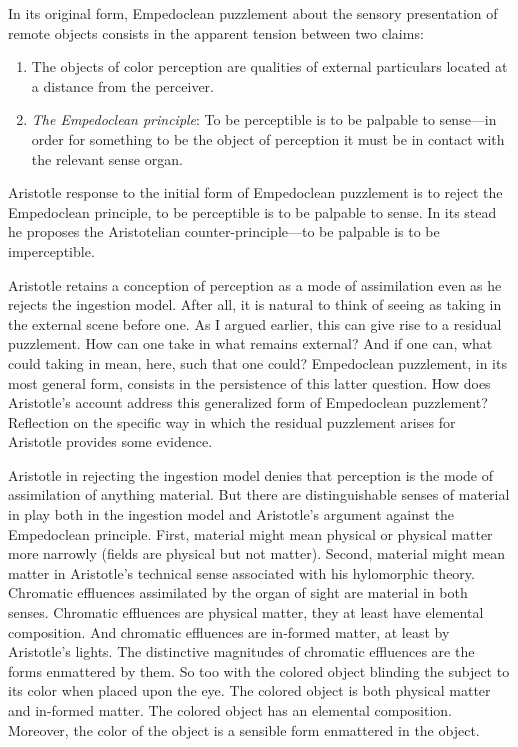 In its original form, Empedoclean puzzlement about the sensory presentation of remote objects consists in the apparent tension between two claims:
\begin{enumerate}[(1)]
    \item The objects of color perception are qualities of external particulars located at a distance from the perceiver.
    \item \emph{The Empedoclean principle}: To be perceptible is to be palpable to sense---in order for something to be the object of perception it must be in contact with the relevant sense organ.
\end{enumerate}
Aristotle response to the initial form of Empedoclean puzzlement is to reject the Empedoclean principle, to be perceptible is to be palpable to sense. In its stead he proposes the Aristotelian counter-principle---to be palpable is to be imperceptible. 

Aristotle retains a conception of perception as a mode of assimilation even as he rejects the ingestion model. After all, it is natural to think of seeing as taking in the external scene before one. As I argued earlier, this can give rise to a residual puzzlement. How can one take in what remains external? And if one can, what could taking in mean, here, such that one could? Empedoclean puzzlement, in its most general form, consists in the persistence of this latter question. How does Aristotle's account address this generalized form of Empedoclean puzzlement? Reflection on the specific way in which the residual puzzlement arises for Aristotle provides some evidence.

Aristotle in rejecting the ingestion model denies that perception is the mode of assimilation of anything material. But there are distinguishable senses of material in play both in the ingestion model and Aristotle's argument against the Empedoclean principle. First, material might mean physical or physical matter more narrowly (fields are physical but not matter). Second, material might mean matter in Aristotle's technical sense associated with his hylomorphic theory. Chromatic effluences assimilated by the organ of sight are material in both senses. Chromatic effluences are physical matter, they at least have elemental composition. And chromatic effluences are in-formed matter, at least by Aristotle's lights. The distinctive magnitudes of chromatic effluences are the forms enmattered by them. So too with the colored object blinding the subject to its color when placed upon the eye. The colored object is both physical matter and in-formed matter. The colored object has an elemental composition. Moreover, the color of the object is a sensible form enmattered in the object.

